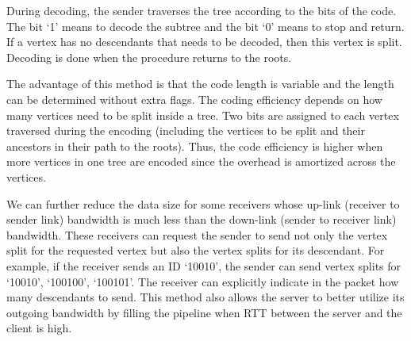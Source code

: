     During decoding, the sender traverses the tree according to the bits of the code. 
    The bit `1' means to decode the subtree and the bit `0' means to stop and return.
    If a vertex has no descendants that needs to be decoded, then this vertex is split. 
    Decoding is done when the procedure returns to the roots.
    
    The advantage of this method is that the code length is variable and the 
    length can be determined without extra flags. The coding efficiency depends
    on how many vertices need to be split inside a tree. Two bits
    are assigned to each vertex traversed during the encoding
    (including the vertices to be split and their ancestors in their path
    to the roots). Thus, the code efficiency is higher when more vertices in one tree
    are encoded since the overhead is amortized across the vertices. 

    We can further reduce the data size for some receivers whose up-link (receiver to
    sender link) bandwidth is much less than the down-link (sender to receiver link) 
    bandwidth. These receivers can request the sender to send not only the vertex split
    for the requested vertex but also the vertex splits for its descendant.
    For example, if the receiver sends an ID 
    `10010', the sender can send vertex splits for `10010', `100100', `100101'.
    The receiver can explicitly indicate in the packet how many descendants to send. This method 
	also allows the server to better utilize its outgoing bandwidth by filling the pipeline when RTT between the server and the client is high.

